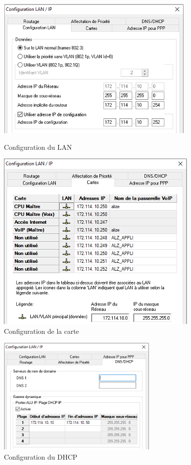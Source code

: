 \documentclass[12pt, a4paper]{article}
\begin{document}
	\begin{figure}[h]
		\begin{minipage}[c]{.46\linewidth}
			\centering
			\includegraphics{img/lan.png}
			\caption{Configuration du LAN}
		\end{minipage}
		\hfill%
		\begin{minipage}[c]{.46\linewidth}
			\centering
			\includegraphics{img/carte.png}
			\caption{Configuration de la carte}
		\end{minipage}
	\end{figure}

	\begin{figure}[H]
		\centering
		\includegraphics[width=0.7\textwidth]{img/dhcp.png}
		\caption{Configuration du DHCP}
		\label{fig:dhcp}
	\end{figure}
\end{document}
